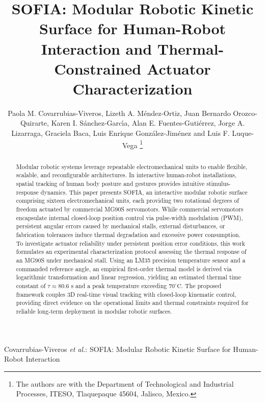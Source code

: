 \documentclass[lettersize,journal]{IEEEtran}
\begin{document}
\title{SOFIA: Modular Robotic Kinetic Surface for Human-Robot Interaction and Thermal-Constrained Actuator Characterization}

\author{Paola M. Covarrubias-Viveros, Lizeth A. M{\'e}ndez-Ortiz, Juan Bernardo Orozco-Quirarte, Karen I. S{\'a}nchez-Garc{\'\i}a, Alan E. Fuentes-Guti{\'e}rrez, Jorge A. Lizarraga, Graciela Baca, Luis Enrique Gonz{\'a}lez-Jim{\'e}nez and Luis F. Luque-Vega
\thanks{The authors are with the Department of Technological and
Industrial Processes, ITESO, Tlaquepaque 45604, Jalisco, Mexico.}}

%
{Covarrubias-Viveros \MakeLowercase{\textit{et al.}}: SOFIA: Modular Robotic Kinetic Surface for Human-Robot Interaction}

\maketitle

\begin{abstract}
Modular robotic systems leverage repeatable electromechanical units to enable flexible, scalable, and reconfigurable architectures. In interactive human-robot installations, spatial tracking of human body posture and gestures provides intuitive stimulus-response dynamics. This paper presents SOFIA, an interactive modular robotic surface comprising sixteen electromechanical units, each providing two rotational degrees of freedom actuated by commercial MG90S servomotors. While commercial servomotors encapsulate internal closed-loop position control via pulse-width modulation (PWM), persistent angular errors caused by mechanical stalls, external disturbances, or fabrication tolerances induce thermal degradation and excessive power consumption. To investigate actuator reliability under persistent position error conditions, this work formulates an experimental characterization protocol assessing the thermal response of an MG90S under mechanical stall. Using an LM35 precision temperature sensor and a commanded reference angle, an empirical first-order thermal model is derived via logarithmic transformation and linear regression, yielding an estimated thermal time constant of $\tau \approx 80.6\text{ s}$ and a peak temperature exceeding $70^\circ\text{C}$. The proposed framework couples 3D real-time visual tracking with closed-loop kinematic control, providing direct evidence on the operational limits and thermal constraints required for reliable long-term deployment in modular robotic surfaces.
\end{abstract}
\end{document}
